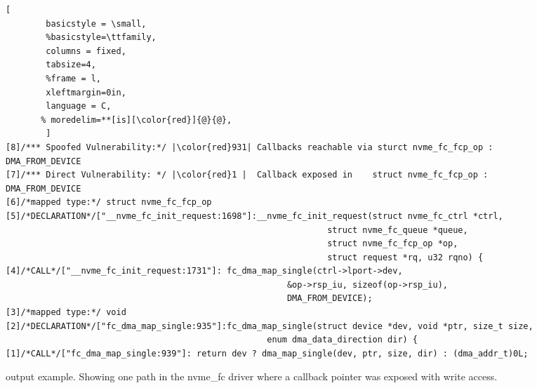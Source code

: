 \begin{figure*}[t]
\begin{adjustbox}{width=\linewidth}
        \begin{lstlisting}[
        basicstyle = \small,
        %basicstyle=\ttfamily,
        columns = fixed,
        tabsize=4,
        %frame = l,
        xleftmargin=0in,
        language = C,
       % moredelim=**[is][\color{red}]{@}{@},
        ]
[8]/*** Spoofed Vulnerability:*/ |\color{red}931| Callbacks reachable via sturct nvme_fc_fcp_op : DMA_FROM_DEVICE
[7]/*** Direct Vulnerability: */ |\color{red}1 |  Callback exposed in    struct nvme_fc_fcp_op : DMA_FROM_DEVICE
[6]/*mapped type:*/ struct nvme_fc_fcp_op
[5]/*DECLARATION*/["__nvme_fc_init_request:1698"]:__nvme_fc_init_request(struct nvme_fc_ctrl *ctrl,
                                                                struct nvme_fc_queue *queue, 
                                                                struct nvme_fc_fcp_op *op, 
                                                                struct request *rq, u32 rqno) {
[4]/*CALL*/["__nvme_fc_init_request:1731"]: fc_dma_map_single(ctrl->lport->dev,
                                                        &op->rsp_iu, sizeof(op->rsp_iu),
                                                        DMA_FROM_DEVICE);
[3]/*mapped type:*/ void
[2]/*DECLARATION*/["fc_dma_map_single:935"]:fc_dma_map_single(struct device *dev, void *ptr, size_t size, 
                                                    enum dma_data_direction dir) {
[1]/*CALL*/["fc_dma_map_single:939"]: return dev ? dma_map_single(dev, ptr, size, dir) : (dma_addr_t)0L;

                \end{lstlisting}
\end{adjustbox}
        \caption{\tool output example. Showing one path in the nvme\_fc driver where a callback pointer was exposed with write access.}
        \label{fig:tool_example}

\end{figure*}
